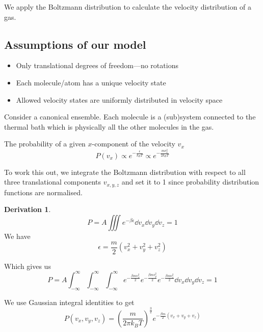 \documentclass[12pt,chapterprefix=false,dvipsnames]{scrbook}
\theoremstyle{dotless}
\theoremstyle{definition}
\newtheorem{protoderivation}{Derivation}[section]
\newenvironment{derivation}
{\colorlet{shadecolor}{purple!15}\begin{shaded}\begin{protoderivation}}
			{\end{protoderivation}\end{shaded}}
\begin{document}
We apply the Boltzmann distribution to calculate the velocity
distribution of a gas.

\subsection{Assumptions of our model}%
\label{sub:assumptions_of_our_model}

\begin{itemize}
	\item Only translational degrees of freedom---no rotations
	\item Each molecule/atom has a unique velocity state
	\item Allowed velocity states are uniformly distributed in velocity
	      space
\end{itemize}

Consider a canonical ensemble. Each molecule is a (sub)system
connected to the thermal bath which is physically all the other
molecules in the gas.

The probability of a given $x$-component of
the velocity $v_x$
\begin{equation}
	P\left(v_x\right) \propto
    e^{-\frac{\epsilon}{k_B T}}\propto
    e^{-\frac{mv^2_x}{2 k_B T}}
\end{equation}

To work this out, we integrate the Boltzmann distribution with
respect to all three translational components
$v_{x,y,z}$ and set it to 1 since probability
distribution functions are normalised.
\begin{derivation}
	\begin{equation}
		P = A \iiint
		e^{-\beta \epsilon}\dd{v_x}\dd{v_y}\dd{v_z}
		= 1
	\end{equation}
	We have
	\begin{equation}
		\epsilon
		=
		\frac{m}{2} \left(v_x^2 + v_y^2 + v_z^2\right)
	\end{equation}

	Which gives us
	\begin{equation}
		P = A
		\int_{-\infty}^{\infty}\int_{-\infty}^{\infty}\int_{-\infty}^{\infty}
		e^{-\frac{\beta m v^2_x}{2}}e^{-\frac{\beta m v^2_y}{2}}e^{-\frac{\beta m v^2_z}{2}}\dd{v_x}\dd{v_y}\dd{v_z}
		= 1
	\end{equation}

	We use Gaussian integral identities to get
	\begin{equation}
		P\left(v_x, v_y, v_z\right) =
        {\left(\frac{m}{2\pi k_B T}\right)}^{\frac{3}{2}}e^{-\frac{\beta m}{2}\left(v_x + v_y + v_z\right)}
	\end{equation}
\end{derivation}
\end{document}
